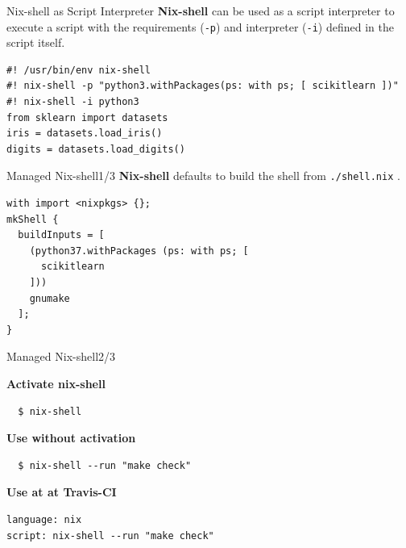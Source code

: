 \documentclass[10pt,aspectratio=169]{beamer}
\begin{document}

\begin{frame}[fragile]{Nix-shell as Script Interpreter}
  \textbf{Nix-shell} can be used as a script interpreter to execute a script with the requirements (\texttt{-p}) and interpreter (\texttt{-i}) defined in the script itself.
  \begin{verbatim}
#! /usr/bin/env nix-shell
#! nix-shell -p "python3.withPackages(ps: with ps; [ scikitlearn ])"
#! nix-shell -i python3
from sklearn import datasets
iris = datasets.load_iris()
digits = datasets.load_digits()
  \end{verbatim}
\end{frame}


\begin{frame}[fragile]{Managed Nix-shell\hfill1/3}
  \textbf{Nix-shell} defaults to build the shell from \texttt{./shell.nix} .
  \begin{verbatim}
with import <nixpkgs> {};
mkShell {
  buildInputs = [
    (python37.withPackages (ps: with ps; [
      scikitlearn
    ]))
    gnumake
  ];
}
  \end{verbatim}
\end{frame}


\begin{frame}[fragile]{Managed Nix-shell\hfill2/3}

  \textbf{Activate nix-shell}
  \begin{verbatim}
  $ nix-shell
  \end{verbatim}

  \textbf{Use without activation}
  \begin{verbatim}
  $ nix-shell --run "make check"
  \end{verbatim}

  \textbf{Use at at Travis-CI}
  \begin{verbatim}
language: nix
script: nix-shell --run "make check"
  \end{verbatim}

\end{frame}

\end{document}
